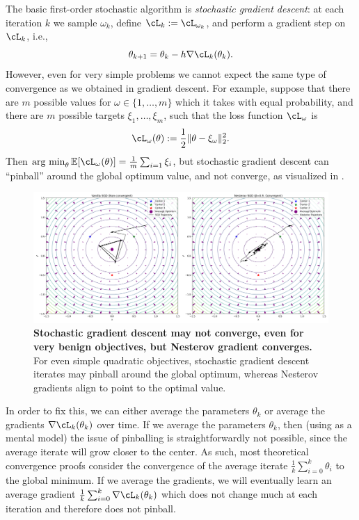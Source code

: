 \documentclass[../../book-main.tex]{subfiles}
\begin{document}
The basic first-order stochastic algorithm is \textit{stochastic gradient descent}: at each iteration \(k\) we sample \(\omega_{k}\), define \(\cL_{k} := \cL_{\omega_{k}}\), and perform a gradient step on \(\cL_{k}\), i.e.,
\begin{equation}
    \theta_{k + 1} = \theta_{k} - h\nabla \cL_{k}(\theta_{k}).
\end{equation}
However, even for very simple problems we cannot expect the same type of convergence as we obtained in gradient descent. For example, suppose that there are \(m\) possible values for \(\omega \in \{1, \dots, m\}\) which it takes with equal probability, and there are \(m\) possible targets \(\xi_{1}, \dots, \xi_{m}\), such that the loss function \(\cL_{\omega}\) is
\begin{equation}
    \cL_{\omega}(\theta) := \frac{1}{2}\norm{\theta - \xi_{\omega}}_{2}^{2}.
\end{equation}
Then \(\argmin_{\theta}\Ex[\cL_{\omega}(\theta)] = \frac{1}{m}\sum_{i = 1}\xi_{i}\), but stochastic gradient descent can ``pinball'' around the global optimum value, and not converge, as visualized in . 

\begin{figure}
    \includegraphics[width=\textwidth]{chapters/appendixA/figs/sgd_vs_nesterov.png}
    \centering 
    \caption{\small\textbf{Stochastic gradient descent may not converge, even for very benign objectives, but Nesterov gradient converges.} For even simple quadratic objectives, stochastic gradient descent iterates may pinball around the global optimum, whereas Nesterov gradients align to point to the optimal value.}
    \label{fig:sgd_nonconvergence}
\end{figure}

In order to fix this, we can either average the parameters \(\theta_{k}\) or average the gradients \(\nabla \cL_{k}(\theta_{k})\) over time. If we average the parameters \(\theta_{k}\), then (using  as a mental model) the issue of pinballing is straightforwardly not possible, since the average iterate will grow closer to the center. As such, most theoretical convergence proofs consider the convergence of the average iterate \(\frac{1}{k}\sum_{i = 0}^{k}\theta_{i}\) to the global minimum. If we average the gradients, we will eventually learn an average gradient \(\frac{1}{k}\sum_{i = 0}^{k}\nabla \cL_{k}(\theta_{k})\) which does not change much at each iteration and therefore does not pinball.
\end{document}
